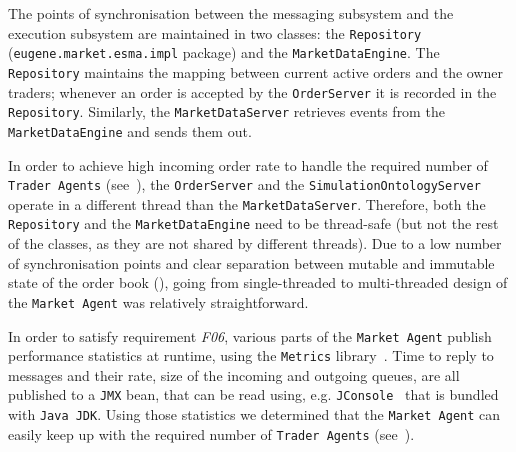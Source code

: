 The points of synchronisation between the messaging subsystem and the execution subsystem are maintained in two classes: the \texttt{Repository} (\texttt{eugene.market.esma.impl} package) and the \texttt{MarketDataEngine}.  The \texttt{Repository} maintains the mapping between current active orders and the owner traders; whenever an order is accepted by the \texttt{OrderServer} it is recorded in the \texttt{Repository}. Similarly, the \texttt{MarketDataServer} retrieves events from the \texttt{MarketDataEngine} and sends them out.

In order to achieve high incoming order rate to handle the required number of \texttt{Trader Agents} (see~), the \texttt{OrderServer} and the \texttt{SimulationOntologyServer} operate in a different thread than the \texttt{MarketDataServer}. Therefore, both the \texttt{Repository} and the \texttt{MarketDataEngine} need to be thread-safe (but not the rest of the classes, as they are not shared by different threads). Due to a low number of synchronisation points and clear separation between mutable and immutable state of the order book (), going from single-threaded to multi-threaded design of the \texttt{Market Agent} was relatively straightforward.

In order to satisfy requirement \textit{F06}, various parts of the \texttt{Market Agent} publish performance statistics at runtime, using the \texttt{Metrics} library~\cite{Metrics}. Time to reply to messages and their rate, size of the incoming and outgoing queues, are all published to a \texttt{JMX} bean, that can be read using, e.g. \texttt{JConsole}~\cite{JConsole} that is bundled with \texttt{Java JDK}. Using those statistics we determined that the \texttt{Market Agent} can easily keep up with the required number of \texttt{Trader Agents} (see~).

